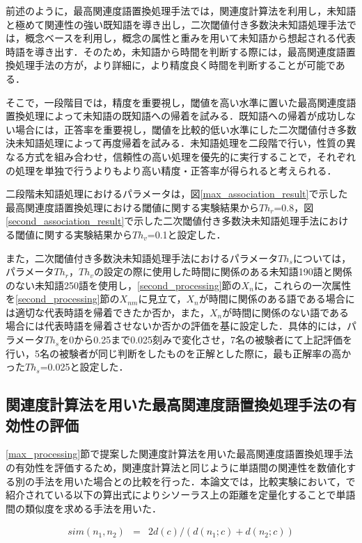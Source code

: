 前述のように，最高関連度語置換処理手法では，関連度計算法を利用し，未知語と極めて関連性の強い既知語を導き出し，二次閾値付き多数決未知語処理手法では，概念ベースを利用し，概念の属性と重みを用いて未知語から想起される代表時語を導き出す．そのため，未知語から時間を判断する際には，最高関連度語置換処理手法の方が，より詳細に，より精度良く時間を判断することが可能である．

そこで，一段階目では，精度を重要視し，閾値を高い水準に置いた最高関連度語置換処理によって未知語の既知語への帰着を試みる．既知語への帰着が成功しない場合には，正答率を重要視し，閾値を比較的低い水準にした二次閾値付き多数決未知語処理によって再度帰着を試みる．未知語処理を二段階で行い，性質の異なる方式を組み合わせ，信頼性の高い処理を優先的に実行することで，それぞれの処理を単独で行うよりもより高い精度・正答率が得られると考えられる．

二段階未知語処理におけるパラメータは，図\ref{max_association_result}で示した最高関連度語置換処理における閾値に関する実験結果から$Th_r$=0.8，図\ref{second_association_result}で示した二次閾値付き多数決未知語処理手法における閾値に関する実験結果から$Th_v$=0.1と設定した．

また，二次閾値付き多数決未知語処理手法におけるパラメータ$Th_s$については，パラメータ$Th_r$，$Th_v$の設定の際に使用した時間に関係のある未知語190語と関係のない未知語250語を使用し，\ref{second_processing}節の$X_n$に，これらの一次属性を\ref{second_processing}節の$X_{nm}$に見立て，$X_n$が時間に関係のある語である場合には適切な代表時語を帰着できたか否か，また，$X_n$が時間に関係のない語である場合には代表時語を帰着させないか否かの評価を基に設定した．具体的には，パラメータ$Th_s$を0から0.25まで0.025刻みで変化させ，7名の被験者にて上記評価を行い，5名の被験者が同じ判断をしたものを正解とした際に，最も正解率の高かった$Th_s$=0.025と設定した．


\subsection{関連度計算法を用いた最高関連度語置換処理手法の有効性の評価}
\ref{max_processing}節で提案した関連度計算法を用いた最高関連度語置換処理手法の有効性を評価するため，関連度計算法と同じように単語間の関連性を数値化する別の手法を用いた場合との比較を行った．本論文では，比較実験において，\cite{nagao:96}で紹介されている以下の算出式によりシソーラス上の距離を定量化することで単語間の類似度を求める手法を用いた．

	\begin{eqnarray}
	sim(n_1, n_2) &=& 2d(c)/(d(n_1;c)+d(n_2;c)) \nonumber
	\end{eqnarray}

